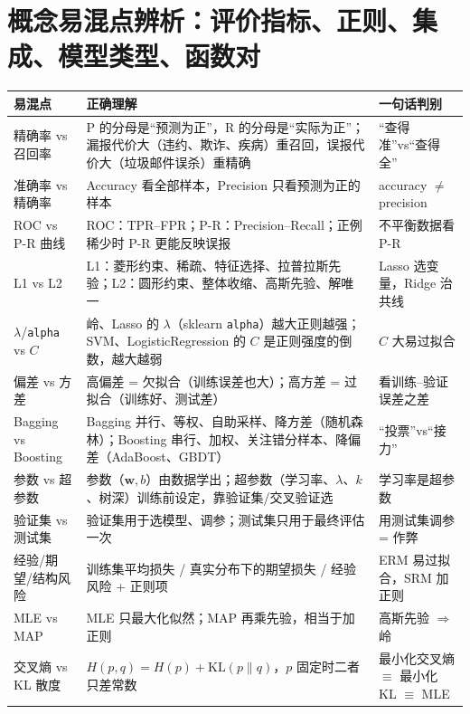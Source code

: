 \section{概念易混点辨析：评价指标、正则、集成、模型类型、函数对}
\begingroup\DEsz\setlength{\LTpre}{1pt}\setlength{\LTpost}{2pt}\setlength{\tabcolsep}{2.5pt}\renewcommand{\arraystretch}{1.0}
\begin{longtable}{@{}>{\raggedright\arraybackslash}p{3.2cm}>{\raggedright\arraybackslash}p{\dimexpr\textwidth-6.9cm-10pt\relax}>{\raggedright\arraybackslash}p{3.7cm}@{}}\toprule
\bfseries 易混点 & \bfseries 正确理解 & \bfseries 一句话判别\\\midrule\endhead
精确率 vs 召回率 & P 的分母是“预测为正”，R 的分母是“实际为正”；漏报代价大（违约、欺诈、疾病）重召回，误报代价大（垃圾邮件误杀）重精确 & “查得准”vs“查得全”\\
准确率 vs 精确率 & Accuracy 看全部样本，Precision 只看预测为正的样本 & accuracy $\ne$ precision\\
ROC vs P-R 曲线 & ROC：TPR–FPR；P-R：Precision–Recall；正例稀少时 P-R 更能反映误报 & 不平衡数据看 P-R\\
L1 vs L2 & L1：菱形约束、稀疏、特征选择、拉普拉斯先验；L2：圆形约束、整体收缩、高斯先验、解唯一 & Lasso 选变量，Ridge 治共线\\
$\lambda$/\texttt{alpha} vs $C$ & 岭、Lasso 的 $\lambda$（sklearn \texttt{alpha}）越大正则越强；SVM、LogisticRegression 的 $C$ 是正则强度的倒数，越大越弱 & $C$ 大易过拟合\\
偏差 vs 方差 & 高偏差 = 欠拟合（训练误差也大）；高方差 = 过拟合（训练好、测试差） & 看训练–验证误差之差\\
Bagging vs Boosting & Bagging 并行、等权、自助采样、降方差（随机森林）；Boosting 串行、加权、关注错分样本、降偏差（AdaBoost、GBDT） & “投票”vs“接力”\\
参数 vs 超参数 & 参数（$\bm w,b$）由数据学出；超参数（学习率、$\lambda$、$k$、树深）训练前设定，靠验证集/交叉验证选 & 学习率是超参数\\
验证集 vs 测试集 & 验证集用于选模型、调参；测试集只用于最终评估一次 & 用测试集调参 = 作弊\\
经验/期望/结构风险 & 训练集平均损失 / 真实分布下的期望损失 / 经验风险 + 正则项 & ERM 易过拟合，SRM 加正则\\
MLE vs MAP & MLE 只最大化似然；MAP 再乘先验，相当于加正则 & 高斯先验 $\Rightarrow$ 岭\\
交叉熵 vs KL 散度 & $H(p,q)=H(p)+\mathrm{KL}(p\|q)$，$p$ 固定时二者只差常数 & 最小化交叉熵 $\equiv$ 最小化 KL $\equiv$ MLE\\

\end{longtable}
